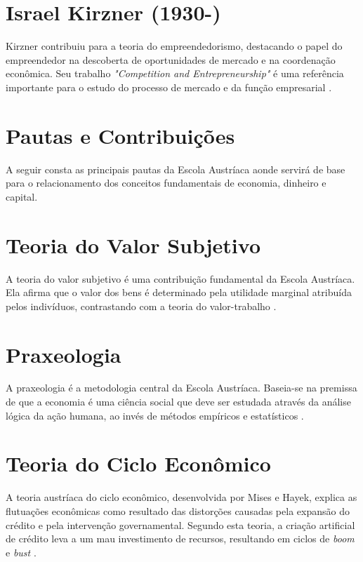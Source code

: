 \section*{Israel Kirzner (1930-)}
Kirzner contribuiu para a teoria do empreendedorismo, destacando o papel do empreendedor na descoberta de oportunidades de mercado e na coordenação econômica. Seu trabalho \textit{"Competition and Entrepreneurship"} é uma referência importante para o estudo do processo de mercado e da função empresarial \cite{kirzner1973competition}.

\section*{Pautas e Contribuições}
A seguir consta as principais pautas da Escola Austríaca aonde servirá de base para o relacionamento dos conceitos fundamentais de economia, dinheiro e capital.

\section*{Teoria do Valor Subjetivo}

A teoria do valor subjetivo é uma contribuição fundamental da Escola Austríaca. Ela afirma que o valor dos bens é determinado pela utilidade marginal atribuída pelos indivíduos, contrastando com a teoria do valor-trabalho \cite{menger1871principles}.

\section*{Praxeologia}

A praxeologia é a metodologia central da Escola Austríaca. Baseia-se na premissa de que a economia é uma ciência social que deve ser estudada através da análise lógica da ação humana, ao invés de métodos empíricos e estatísticos \cite{mises1949human}.

\section*{Teoria do Ciclo Econômico}

A teoria austríaca do ciclo econômico, desenvolvida por Mises e Hayek, explica as flutuações econômicas como resultado das distorções causadas pela expansão do crédito e pela intervenção governamental. Segundo esta teoria, a criação artificial de crédito leva a um mau investimento de recursos, resultando em ciclos de \textit{boom} e \textit{bust} \cite{mises1949human,hayek1944road}.

